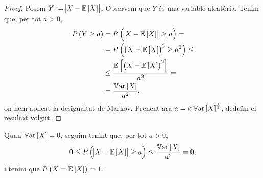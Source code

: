 \begin{proof}
    Posem $Y:=\abs{X-\operatorname{\mathbb{E}}\left[ X\right]}$. Observem que $Y$ és una variable aleatòria. Tenim que, per tot $a>0$,
    \begin{align*}
        P\left( Y\geq a\right) &= P\left(\abs{X-\operatorname{\mathbb{E}}\left[ X\right]}\geq a\right) = \\
        &= P\left(\left( X-\operatorname{\mathbb{E}}\left[ X\right]\right)^2\geq a^2\right) \leq\\
        &\leq \frac{\operatorname{\mathbb{E}}\left[ \left( X-\operatorname{\mathbb{E}}\left[ X\right]\right)^2\right]}{a^2} =\\
        &=\frac{\operatorname{\mathbb{V}ar}\left[ X\right]}{a^2},
    \end{align*}
    on hem aplicat la desigualtat de Markov. Prenent ara $a=k\operatorname{\mathbb{V}ar}\left[ X\right]^{\frac{1}{2}}$, deduïm el resultat volgut.
\end{proof}
\begin{obs}
    Quan $\operatorname{\mathbb{V}ar}\left[ X\right]=0$, seguim tenint que, per tot $a>0$,
    \[
        0\leq P\left(\abs{X-\operatorname{\mathbb{E}}\left[ X\right]} \geq a\right)\leq \frac{\operatorname{\mathbb{V}ar}\left[ X\right]}{a^2} =0,
    \]
    i tenim que $P\left( X=\operatorname{\mathbb{E}}\left[ X\right]\right)=1$.
\end{obs}

